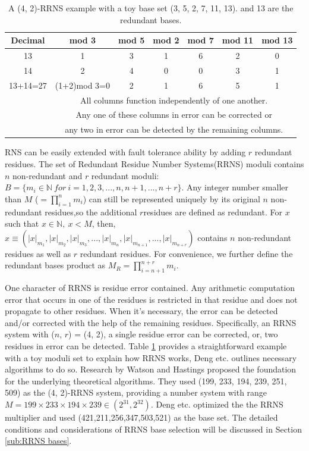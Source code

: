 \documentclass{sig-alternate}
\begin{document}
\begin{table}
\centering{}
\footnotesize
\captionsetup{justification=centering}
\caption{\label{tab:RRNS}A (4, 2)-RRNS example with a toy base set (3, 5, 
2, 7, 11, 13).  and 13 are the redundant bases. }
\begin{tabular}{|c|c|c|c|c|c|c|}
\hline 
Decimal & mod 3 & mod 5 & mod 2 & mod 7 & mod 11 & mod 13\tabularnewline
\hline 
\hline 
13 & 1 & 3 & 1 & 6 & 2 & 0\tabularnewline
\hline 
14 & 2 & 4 & 0 & 0 & 3 & 1\tabularnewline
\hline 
13+14=27 & (1+2)mod 3=0 & 2 & 1 & 6 & 5 & 1\tabularnewline
\hline 
 & \multicolumn{6}{c|}{All columns function independently of one another. }\tabularnewline
\cline{2-7} 
 & \multicolumn{6}{c|}{Any one of these columns in error can be corrected or  }\tabularnewline
 & \multicolumn{6}{c|}{any two in error can be detected by the remaining columns.}\tabularnewline

 
\hline 
\end{tabular}

\end{table}


RNS can be easily extended with fault tolerance ability by adding $r$ redundant residues. The set of Redundant Residue Number Systems(RRNS) moduli contains $n$ non-redundant and $r$ redundant moduli: $B=\{m_i\in\mathbb{N}~for~i = 1,2,3,...,n,n+1,...,n+r\}$. Any integer number smaller than $M$ ($=\prod_{i=1}^{n}m_i$) can still be represented uniquely by its original $n$ non-redundant residues,so the additional  $r$residues are defined as redundant. For $x$ such that $x\in\mathbb{N},~x < M$, then, $x \equiv (|x|_{m_1}, |x|_{m_2}, |x|_{m_3}, ..., |x|_{m_n}, |x|_{m_{n+1}}, ..., |x|_{m_{n+r}})$ contains $n$ non-redundant residues as well as $r$ redundant residues. For convenience, we further define the redundant bases product as $M_R = \prod_{i=n+1}^{n+r}m_i$. 

One character of RRNS is residue error contained. Any arithmetic computation error that occurs in one of the residues is restricted in that residue and does not propagate to other residues. When it's necessary, the error can be detected and/or corrected with the help of the remaining residues. Specifically, an RRNS system with ($n$, $r$) = (4, 2), a single residue error can be corrected, or, two residues in error can be detected. Table \ref{tab:RRNS} provides a straightforward example with a toy moduli set to explain how RRNS works, Deng etc. \cite{DengTACO18} outlines necessary algorithms to do so. Research by Watson and Hastings  \cite{Hastings, WatsonThesis, WatsonHastings} proposed the foundation for the underlying theoretical algorithms. They used (199, 233, 194, 239, 251, 509) as the (4, 2)-RRNS system, providing a number system with range $M = 199\times 233\times 194\times 239 \in (2^{31}, 2^{32})$. Deng etc. \cite{DengTACO18} optimized the the RRNS multiplier and used (421,211,256,347,503,521) as the base set. The detailed conditions and considerations of RRNS base selection will be discussed in Section \ref{sub:RRNS bases}.
\end{document}
